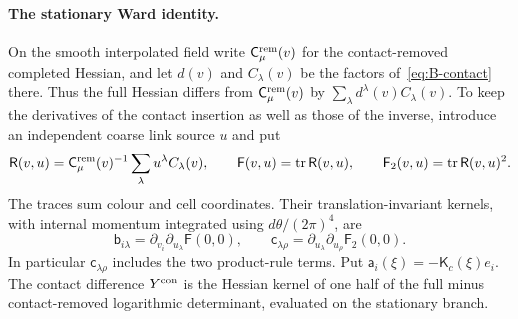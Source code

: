 \paragraph{The stationary Ward identity.} On the smooth interpolated field write $\mathsf C^{\rm rem}_\mu(v)$ for the contact-removed completed Hessian, and let $d(v)$ and $C_\lambda(v)$ be the factors of~\eqref{eq:B-contact} there. Thus the full Hessian differs from $\mathsf C^{\rm rem}_\mu(v)$ by $\sum_\lambda d^\lambda(v)C_\lambda(v)$. To keep the derivatives of the contact insertion as well as those of the inverse, introduce an independent coarse link source $u$ and put
\begin{equation*}
\mathsf R(v,u)=\mathsf C^{\rm rem}_\mu(v)^{-1}\sum_\lambda u^\lambda C_\lambda(v),\qquad
\mathsf F(v,u)=\operatorname{tr}\mathsf R(v,u),\qquad
\mathsf F_2(v,u)=\operatorname{tr}\mathsf R(v,u)^2.
\end{equation*}
The traces sum colour and cell coordinates. Their translation-invariant kernels, with internal momentum integrated using $d\theta/(2\pi)^4$, are
\begin{equation*}
\mathsf b_{i\lambda}=\partial_{v_i}\partial_{u_\lambda}\mathsf F(0,0),\qquad
\mathsf c_{\lambda\rho}=\partial_{u_\lambda}\partial_{u_\rho}\mathsf F_2(0,0).
\end{equation*}
In particular $\mathsf c_{\lambda\rho}$ includes the two product-rule terms. Put $\mathsf a_i(\xi)=-\mathsf K_c(\xi)e_i$. The contact difference $Y^{\rm con}$ is the Hessian kernel of one half of the full minus contact-removed logarithmic determinant, evaluated on the stationary branch.

